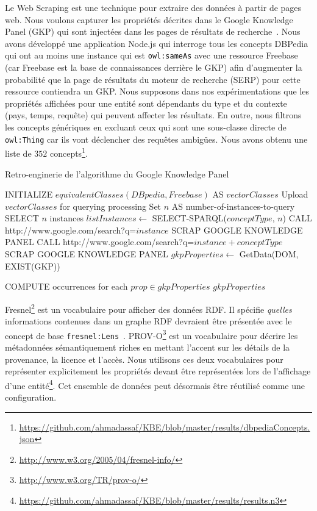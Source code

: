 Le Web Scraping est une technique pour extraire des donn\'{e}es \`{a} partir de pages web. Nous voulons capturer les propri\'{e}t\'{e}s d\'{e}crites dans le Google Knowledge Panel (GKP) qui sont inject\'{e}es dans les pages de r\'{e}sultats de recherche~\cite{Bergman:GKG:12}. Nous avons d\'{e}velopp\'{e} une application Node.js qui interroge tous les concepts DBPedia qui ont au moins une instance qui est \texttt{owl:sameAs} avec une ressource Freebase (car Freebase est la base de connaissances derri\`{e}re le GKP) afin d'augmenter la probabilit\'{e} que la page de r\'{e}sultats du moteur de recherche (SERP) pour cette ressource contiendra un GKP. Nous supposons dans nos exp\'{e}rimentations que les propri\'{e}t\'{e}s affich\'{e}es pour une entit\'{e} sont d\'{e}pendants du type et du contexte (pays, temps, requ\^{e}te) qui peuvent affecter les r\'{e}sultats. En outre, nous filtrons les concepts g\'{e}n\'{e}riques en excluant ceux qui sont une sous-classe directe de \texttt{owl:Thing} car ils vont d\'{e}clencher des requ\^{e}tes ambig\"{u}es. Nous avons obtenu une liste de $352$ concepts\footnote{\url{https://github.com/ahmadassaf/KBE/blob/master/results/dbpediaConcepts.json}}.

\begin{algorithm}[ht]
\caption{Retro-enginerie de l'algorithme du Google Knowledge Panel}
\begin{algorithmic}[1]
\small
\STATE INITIALIZE $equivalentClasses(DBpedia,Freebase) $ AS $vectorClasses$
\STATE Upload $vectorClasses$ for querying processing
\STATE Set $n$ AS number-of-instances-to-query
\STATE SELECT $n$ instances
\STATE $listInstances \leftarrow$ SELECT-SPARQL($conceptType$, $n$)
\STATE CALL http://www.google.com/search?q=$instance$
\STATE SCRAP GOOGLE KNOWLEDGE PANEL
\ELSE
\STATE CALL http://www.google.com/search?q=$instance + conceptType$
\STATE SCRAP GOOGLE KNOWLEDGE PANEL
\ENDIF
\STATE $gkpProperties \leftarrow$ GetData(DOM, EXIST(GKP))

\ENDFOR
\STATE COMPUTE occurrences for each $prop \in gkpProperties$
\ENDFOR
\STATE $gkpProperties$
\end{algorithmic}
\end{algorithm}

Fresnel\footnote{\url{http://www.w3.org/2005/04/fresnel-info/}} est un vocabulaire pour afficher des donn\'{e}es RDF. Il sp\'{e}cifie \textit{quelles} informations contenues dans un graphe RDF devraient \^{e}tre pr\'{e}sent\'{e}e avec le concept de base \texttt{fresnel:Lens}~\cite{Pietriga:ISWC:06}. PROV-O\footnote{\url{http://www.w3.org/TR/prov-o/}} est un vocabulaire pour d\'{e}crire les m\'{e}tadonn\'{e}es s\'{e}mantiquement riches en mettant l'accent sur les d\'{e}tails de la provenance, la licence et l'acc\`{e}s. Nous utilisons ces deux vocabulaires pour repr\'{e}senter explicitement les propri\'{e}t\'{e}s devant \^{e}tre repr\'{e}sent\'{e}es lors de l'affichage d'une entit\'{e}\footnote{\url{https://github.com/ahmadassaf/KBE/blob/master/results/results.n3}}. Cet ensemble de donn\'{e}es peut d\'{e}sormais \^{e}tre r\'{e}utilis\'{e} comme une configuration.


